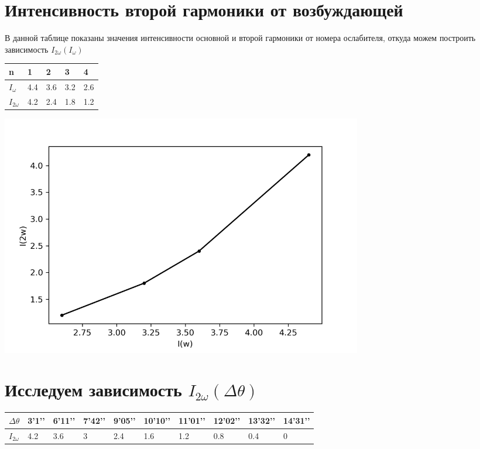 \documentclass[a4paper,14pt]{article} %
\begin{document}
\section{Интенсивность второй гармоники от возбуждающей}
В данной таблице показаны значения интенсивности основной и второй гармоники от номера ослабителя, откуда можем построить зависимость $I_{2 \omega} (I_{\omega})$

\begin{table}[H]
\begin{tabular}{|l|l|l|l|l|}
\hline
n     & 1   & 2   & 3   & 4   \\ \hline
$I_{\omega}$  & 4.4 & 3.6 & 3.2 & 2.6 \\ \hline
$I_{2 \omega}$ & 4.2 & 2.4 & 1.8 & 1.2 \\ \hline
\end{tabular}
\end{table}

\begin{center}
\includegraphics[width = 0.7\textwidth]{images/plot_1}
\end{center}

\section{Исследуем зависимость $I_{2\omega} (\Delta \theta)$}

\begin{table}[H]
\begin{tabular}{|l|l|l|l|l|l|l|l|l|l|}
\hline
$\Delta \theta$ & 3’1’’ & 6’11’’ & 7’42’’ & 9’05’’ & 10’10’’ & 11’01’’ & 12’02’’ & 13’32’’ & 14’31’’ \\ \hline
$I_{2 \omega}$           & 4.2   & 3.6    & 3      & 2.4    & 1.6     & 1.2     & 0.8     & 0.4     & 0       \\ \hline
\end{tabular}
\end{table}
\end{document}
